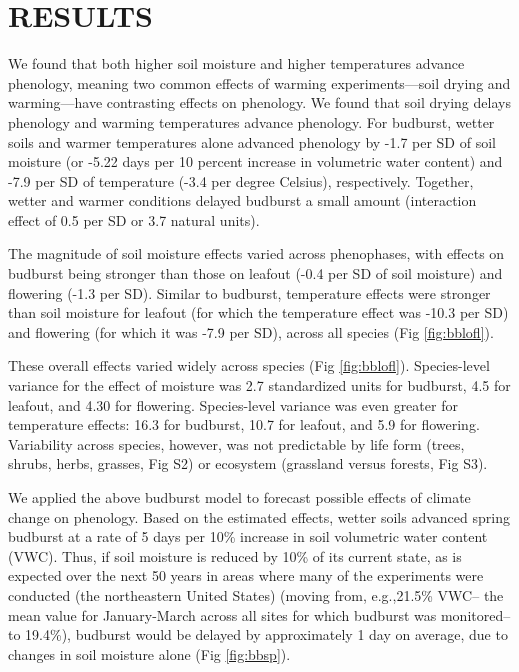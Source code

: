 \documentclass{article}
\begin{document}
\section* {RESULTS}

\par We found that both higher soil moisture and higher temperatures advance phenology, meaning two common effects of warming experiments---soil drying and warming---have contrasting effects on phenology. We found that soil drying delays phenology and warming temperatures advance phenology. For budburst, wetter soils and warmer temperatures alone advanced phenology by -1.7 per SD of soil moisture  (or -5.22 days per 10 percent increase in volumetric water content) and -7.9 per SD of temperature (-3.4 per degree Celsius), respectively. Together, wetter and warmer conditions delayed budburst a small amount (interaction effect of 0.5 per SD or 3.7 natural units). 
\par The magnitude of soil moisture effects varied across phenophases, with effects on budburst being stronger than those on leafout (-0.4 per SD of soil moisture) and flowering (-1.3 per SD). Similar to budburst, temperature effects were stronger than soil moisture for leafout (for which the temperature effect was -10.3 per SD) and flowering (for which it was -7.9 per SD), across all species (Fig \ref{fig:bblofl}). 

\par These overall effects varied widely across species (Fig \ref{fig:bblofl}). Species-level variance for the effect of moisture was 2.7 standardized units for budburst, 4.5 for leafout, and 4.30 for flowering. Species-level variance was even greater for temperature effects: 16.3 for budburst, 10.7 for leafout, and 5.9 for flowering. Variability across species, however, was not predictable by life form (trees, shrubs, herbs, grasses, Fig S2) or ecosystem (grassland versus forests, Fig S3).
\par We applied the above budburst model to forecast possible effects of climate change on phenology. Based on the estimated effects, wetter soils advanced spring budburst at a rate of 5 days per 10\% increase in soil volumetric water content (VWC). Thus, if soil moisture is reduced by 10\% of its current state, as is expected over the next 50 years in areas where many of the experiments were conducted (the northeastern United States) \citep{berg2017} (moving from, e.g.,21.5\% VWC-- the mean value for January-March across all sites for which budburst was monitored-- to 19.4\%), budburst would be delayed by approximately 1 day on average, due to changes in soil moisture alone (Fig \ref{fig:bbsp}).
\end{document}
